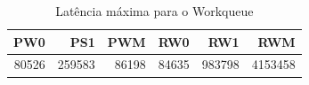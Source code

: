 \begin{table}[!htb]
    \centering
    \begin{center}
        \begin{tabular}{|r|r|r|r|r|r|}
            \toprule
                PW0 &    PS1 &    PWM &    RW0 &     RW1 &    RWM \\
            \midrule
                80526 &	259583 &	86198 & 84635 &	983798 & 	4153458 \\
            \bottomrule
        \end{tabular}
    \end{center}
    \caption{Latência máxima para o Workqueue}
    \label{table:max-workqueue}
\end{table}
